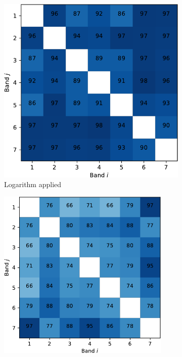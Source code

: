 \documentclass{article}
\begin{document}
\begin{figure}[h] 
  \begin{subfigure}[b]{0.49\linewidth}
    \centering
    \includegraphics[width=0.9\linewidth]{sup-crop.pdf} 
    \caption{Logarithm applied} 
    \label{fig7:a} 
  \end{subfigure}%
  \begin{subfigure}[b]{0.49\linewidth}
    \centering
    \includegraphics[width=0.9\textwidth]{un-crop.pdf} 

\end{subfigure}
\end{figure}
\end{document}
